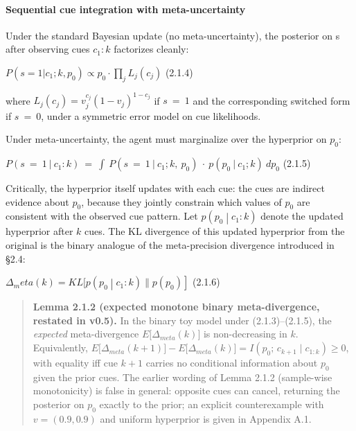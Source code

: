 \documentclass{article}
\begin{document}
\paragraph{Sequential cue integration with
meta-uncertainty}\label{sequential-cue-integration-with-meta-uncertainty}

Under the standard Bayesian update (no meta-uncertainty), the posterior
on s after observing cues \(c_{1}:k\) factorizes cleanly:

\(P\left( s = 1|c_{1};k,p_{0} \right) \propto p_{0} \cdot \prod_{j}^{}L_{j}\left( c_{j} \right)\)
(2.1.4)

where
\(L_{j}\left( c_{j} \right) = v_{j}^{c_{j}}\left( 1 - v_{j} \right)^{1 - c_{j}}\)
if \(s\  = \ 1\) and the corresponding switched form if \(s\  = \ 0\),
under a symmetric error model on cue likelihoods.

Under meta-uncertainty, the agent must marginalize over the hyperprior
on \(p_{0}\):

\(P(s\  = \ 1\ |\ c_{1}:k)\  = \ \int\ P(s\  = \ 1\ |\ c_{1};k,\ p_{0})\  \cdot \ p(p_{0}\ |\ c_{1};k)\ {dp}_{0}\)
(2.1.5)

Critically, the hyperprior itself updates with each cue: the cues are
indirect evidence about \(p_{0}\), because they jointly constrain which
values of \(p_{0}\) are consistent with the observed cue pattern. Let
\(p\left( p_{0} \middle| c_{1}:k \right)\) denote the updated hyperprior
after \(k\) cues. The KL divergence of this updated hyperprior from the
original is the binary analogue of the meta-precision divergence
introduced in \S{}2.4:

\(\Delta_{m}eta(k) = KL\lbrack p\left( p_{0} \middle| c_{1}:k \right)\left. \parallel p\left( p_{0} \right) \right\rbrack\)
(2.1.6)

\begin{quote}
\textbf{Lemma 2.1.2 (expected monotone binary meta-divergence, restated
in v0.5).} In the binary toy model under (2.1.3)--(2.1.5), the
\emph{expected} meta-divergence \(E\lbrack\Delta_{meta}(k)\rbrack\) is
non-decreasing in \(k\). Equivalently,
\(E\lbrack\Delta_{meta}(k + 1)\rbrack - E\lbrack\Delta_{meta}(k)\rbrack = I(p_{0};\, c_{k + 1} \mid c_{1:k}) \geq 0\),
with equality iff cue \(k + 1\) carries no conditional information about
\(p_{0}\) given the prior cues. The earlier wording of Lemma 2.1.2
(sample-wise monotonicity) is false in general: opposite cues can
cancel, returning the posterior on \(p_{0}\) exactly to the prior; an
explicit counterexample with \(v = (0.9,0.9)\) and uniform hyperprior is
given in Appendix A.1.
\end{quote}
\end{document}

